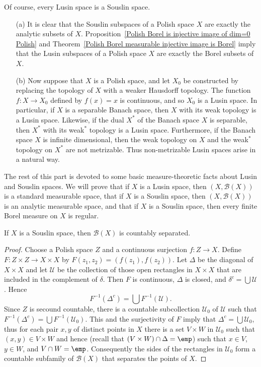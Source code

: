 Of course, every Lusin space is a Souslin space.
\begin{example}
\mbox{}
\begin{itemize}
\item[(a)] It is clear that the Souslin subspaces of a Polish space $X$ are exactly the analytic subsets of $X$. Proposition~\ref{Polish Borel is injective image of dim=0 Polish} and Theorem~\ref{Polish Borel measurable injective image is Borel} imply that the Lusin subspaces of a Polish space $X$ are exactly the Borel subsets of $X$.
\item[(b)] Now suppose that $X$ is a Polish space, and let $X_0$ be constructed by replacing the topology of $X$ with a weaker Hausdorff topology. The function $f:X\to X_0$ defined by $f(x)=x$ is continuous, and so $X_0$ is a Lusin space. In particular, if $X$ is a separable Banach space, then $X$ with its weak topology is a Lusin space. Likewise, if the dual $X^*$ of the Banach space $X$ is separable, then $X^*$ with its weak$^*$ topology is a Lusin space. Furthermore, if the Banach space $X$ is infinite dimensional, then the weak topology on $X$ and the weak$^*$ topology on $X^*$ are not metrizable. Thus non-metrizable Lusin spaces arise in a natural way.
\end{itemize}
\end{example}
The rest of this part is devoted to some basic measure-theoretic facts about Lusin and Souslin spaces. We will prove that if $X$ is a Lusin space, then $(X,\mathcal{B}(X))$ is a standard measurable space, that if $X$ is a Souslin space, then $(X,\mathcal{B}(X))$ is an analytic measurable space, and that if $X$ is a Souslin space, then every finite Borel measure on $X$ is regular.
\begin{lemma}\label{Souslin space is countably separated}
If $X$ is a Souslin space, then $\mathcal{B}(X)$ is countably separated.
\end{lemma}
\begin{proof}
Choose a Polish space $Z$ and a continuous surjection $f:Z\to X$. Define $F:Z\times Z\to X\times X$ by $F(z_1,z_2)=(f(z_1),f(z_2))$. Let $\Delta$ be the diagonal of $X\times X$ and let $\mathcal{U}$ be the collection of those open rectangles in $X\times X$ that are included in the complement of $\delta$. Then $F$ is continuous, $\Delta$ is closed, and $\delta^c=\bigcup\mathcal{U}$. Hence 
\[F^{-1}(\Delta^c)=\bigcup F^{-1}(\mathcal{U}).\]
Since $Z$ is secound countable, there is a countable subcollection $\mathcal{U}_0$ of $\mathcal{U}$ such that $F^{-1}(\Delta^c)=\bigcup F^{-1}(\mathcal{U}_0)$. This and the surjectivity of $F$ imply that $\Delta^c=\bigcup\mathcal{U}_0$, thus for each pair $x,y$ of distinct points in $X$ there is a set $V\times W$ in $\mathcal{U}_0$ such that $(x,y)\in V\times W$ and hence (recall that $(V\times W)\cap\Delta=\emp$) such that $x\in V$, $y\in W$, and $V\cap W=\emp$. Consequently the sides of the rectangles in $\mathcal{U}_0$ form a countable subfamily of $\mathcal{B}(X)$ that separates the points of $X$.
\end{proof}
